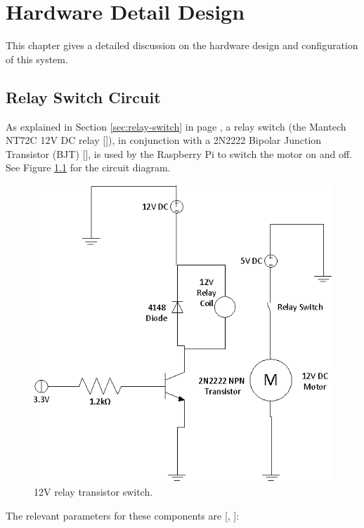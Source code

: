 \chapter{Hardware Detail Design}

This chapter gives a detailed discussion on the hardware design and
configuration of this system. 

\section{Relay Switch Circuit}
\label{sec:detail-switch}

As explained in Section \ref{sec:relay-switch} in page \pageref{sec:relay-switch}, a relay
switch (the Mantech NT72C 12V DC relay [\cite{manual:relay-specs}]), in conjunction with a 2N2222
Bipolar Junction Transistor (BJT) [\cite{maunual:transistor-datasheet}], is used
by the Raspberry Pi to switch the motor on and off. See Figure
\ref{fig:relay-switch} for the circuit diagram.

\begin{figure}
\centering
\includegraphics[scale=0.7]{relay_switch.eps}
\caption{12V relay transistor switch. }
\label{fig:relay-switch}
\end{figure}

The relevant  parameters for these components are [\cite{manual:relay-specs},
\cite{maunual:transistor-datasheet}]:

